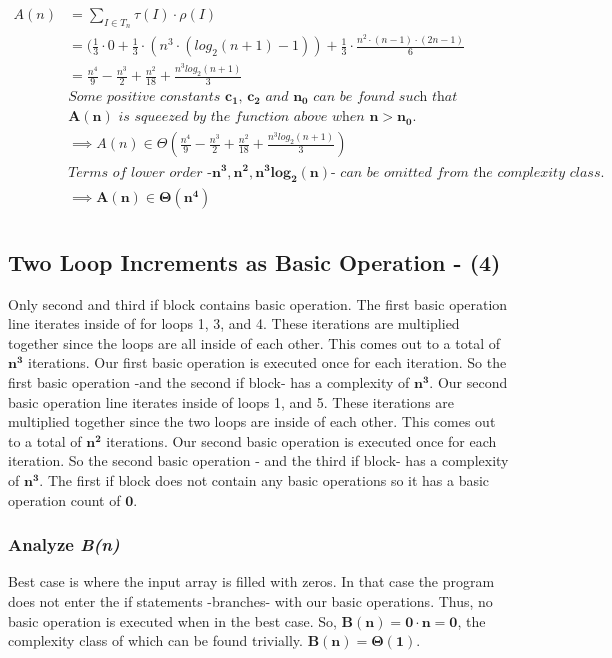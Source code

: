 \documentclass[10pt]{article}
\begin{document}
\begin{align*}
A(n) &= \displaystyle\sum _{I \in T_{n}} \tau (I) \cdot \rho (I) &&\\
 &= (\frac{1}{3} \cdot 0 + \frac{1}{3} \cdot (n^3 \cdot (log_2(n+1) - 1)) + \frac {1}{3} \cdot \frac{ n^2\cdot (n-1) \cdot (2n-1) } {6} && \\
 &= \frac{n^4}{9} - \frac{n^3}{2} + \frac{n^2}{18} + \frac{n^3log_2(n+1)}{3} && \\ 
 &\textit{Some positive constants $\mathbf{c_{1}}$, $\mathbf{c_{2}}$ and $\mathbf{n_{0}}$ can be found such that} && \\ 
 &\textit{$\mathbf{A(n)}$ is squeezed by the function above when $\mathbf{n > n_{0}}$.} && \\
 &\implies A(n) \in \Theta (\frac{n^4}{9} - \frac{n^3}{2} + \frac{n^2}{18} + \frac{n^3log_2(n+1)}{3}) && \\
 &\textit{Terms of lower order -$\mathbf{n^3, n^2, n^3log_2(n)}$- can be omitted from the complexity class.} && \\
 &\implies \mathbf{A(n) \boldsymbol{\in} \Theta (n^4)} && \\
\end{align*}

\subsection{Two Loop Increments as Basic Operation - (4)}
Only second and third if block contains basic operation. The first basic operation line iterates inside of for loops 1, 3, and 4. These iterations are multiplied together since the loops are all inside of each other. This comes out to a total of $\mathbf{n^{3}}$ iterations. Our first basic operation is executed once for each iteration. So the first basic operation -and the second if block- has a complexity of $\mathbf{n^{3}}$. Our second basic operation line iterates inside of loops 1, and 5. These iterations are multiplied together since the two loops are inside of each other. This comes out to a total of $\mathbf{n^{2}}$ iterations. Our  second basic operation is executed once for each iteration. So the second basic operation - and the third if block- has a complexity of $\mathbf{n^{3}}$. The first if block does not contain any basic operations so it has a basic operation count of $\mathbf{0}$.

\subsubsection{Analyze \textit{B(n)}}
Best case is where the input array is filled with zeros. In that case the program does not enter the if statements -branches- with our basic operations. Thus, no basic operation is executed when in the best case. So, $\mathbf{B(n) = 0 \cdot n = 0}$, the complexity class of which can be found trivially. $\mathbf{B(n) = \Theta(1)}$.
\end{document}
